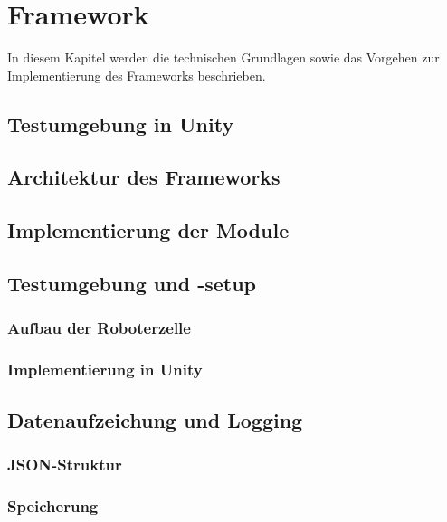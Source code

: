 \chapter{Framework}
\label{cap:framework}
In diesem Kapitel werden die technischen Grundlagen sowie das Vorgehen zur
Implementierung des Frameworks beschrieben.

\section{Testumgebung in Unity}


\section{Architektur des Frameworks}
\label{sec:architektur_frameowork}


\section{Implementierung der Module}









\section{Testumgebung und -setup}
\subsection{Aufbau der Roboterzelle}
\subsection{Implementierung in Unity}
\section{Datenaufzeichung und Logging}
\subsection{JSON-Struktur}
\subsection{Speicherung}
